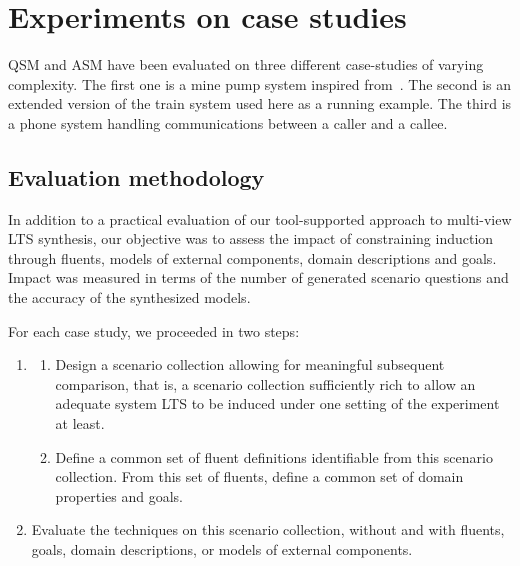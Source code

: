\section{Experiments on case studies\label{section:evaluation-experiments-on-case-studies}}

QSM and ASM have been evaluated on three different case-studies of varying complexity. The first one is a mine pump system inspired from~\cite{Joseph:1996}. The second is an extended version of the train system used here as a running example. The third is a phone system handling communications between a caller and a callee.

\subsection{Evaluation methodology}

In addition to a practical evaluation of our tool-supported approach to multi-view LTS synthesis, our objective was to assess the impact of constraining induction through fluents, models of external components, domain descriptions and goals. Impact was measured in terms of the number of generated scenario questions and the accuracy of the synthesized models.

For each case study, we proceeded in two steps:
\begin{enumerate}
\item\label{stepA}
\begin{enumerate}
\item\label{CondA} Design a scenario collection allowing for meaningful subsequent comparison, that is, a scenario collection sufficiently rich to allow an adequate system LTS to be induced under one setting of the experiment at least.
\item\label{CondB} Define a common set of fluent definitions identifiable from this scenario collection. From this set of fluents, define a common set of domain properties and goals.
\end{enumerate}
\item\label{stepB} Evaluate the techniques on this scenario collection, without and with fluents, goals, domain descriptions, or models of external components.
\end{enumerate}

